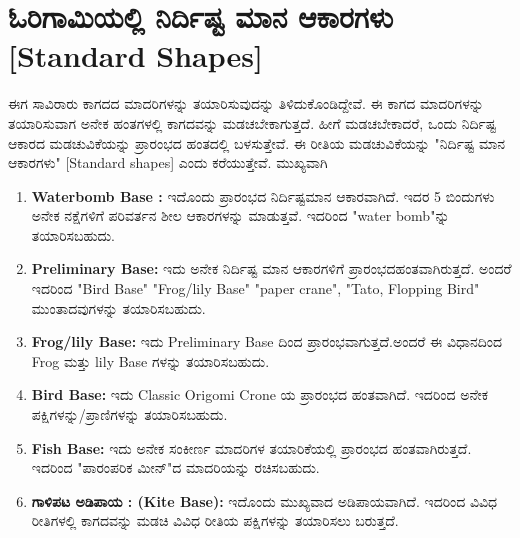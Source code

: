 \bigskip

 
 \section{ಓರಿಗಾಮಿಯಲ್ಲಿ ನಿರ್ದಿಷ್ಟ ಮಾನ ಆಕಾರಗಳು [Standard Shapes]}\label{sec2.1}%
 
 ಈಗ ಸಾವಿರಾರು ಕಾಗದದ ಮಾದರಿಗಳನ್ನು ತಯಾರಿಸುವುದನ್ನು ತಿಳಿದುಕೊಂಡಿದ್ದೇವೆ. ಈ ಕಾಗದ ಮಾದರಿಗಳನ್ನು ತಯಾರಿಸುವಾಗ ಅನೇಕ ಹಂತಗಳಲ್ಲಿ ಕಾಗದವನ್ನು ಮಡಚಬೇಕಾಗುತ್ತದೆ. ಹೀಗೆ ಮಡಚಬೇಕಾದರೆ, ಒಂದು ನಿರ್ದಿಷ್ಟ ಆಕಾರದ ಮಡಚುವಿಕೆಯನ್ನು ಪ್ರಾರಂಭದ ಹಂತದಲ್ಲಿ ಬಳಸುತ್ತೇವೆ. ಈ ರೀತಿಯ ಮಡಚುವಿಕೆಯನ್ನು "ನಿರ್ದಿಷ್ಟ ಮಾನ ಆಕಾರಗಳು" [Standard shapes] ಎಂದು ಕರೆಯುತ್ತೇವೆ. ಮುಖ್ಯವಾಗಿ 
 \begin{enumerate}
  \item[{\bf [a]}] \textbf{Waterbomb Base :} ಇದೊಂದು ಪ್ರಾರಂಭದ ನಿರ್ದಿಷ್ಟಮಾನ ಆಕಾರ\-ವಾಗಿದೆ. ಇದರ 5 ಬಿಂದುಗಳು ಅನೇಕ ನಕ್ಷೆಗಳಿಗೆ ಪರಿವರ್ತನ ಶೀಲ ಆಕಾರಗಳನ್ನು ಮಾಡುತ್ತವೆ. ಇದರಿಂದ "water bomb"ನ್ನು ತಯಾರಿಸಬಹುದು.

\medskip
  
  \item[{\bf [b]}] \textbf{Preliminary Base:} ಇದು ಅನೇಕ ನಿರ್ದಿಷ್ಟ ಮಾನ ಆಕಾರಗಳಿಗೆ ಪ್ರಾರಂಭದ\break ಹಂತವಾಗಿರುತ್ತದೆ. ಅಂದರೆ ಇದರಿಂದ "Bird Base" "Frog/lily Base" "paper crane", "Tato, Flopping Bird"  ಮುಂತಾದವುಗಳನ್ನು ತಯಾರಿಸಬಹುದು.  

\medskip
  
  \item[{\bf [c]}] \textbf{Frog/lily Base:} ಇದು Preliminary Base ದಿಂದ ಪ್ರಾರಂಭವಾಗುತ್ತದೆ.\break ಅಂದರೆ ಈ ವಿಧಾನದಿಂದ Frog ಮತ್ತು lily Base ಗಳನ್ನು ತಯಾರಿಸಬಹುದು.

\medskip
   
  \item[{\bf [d]}] \textbf{Bird  Base:} ಇದು Classic Origomi Crone ಯ ಪ್ರಾರಂಭದ ಹಂತವಾಗಿದೆ. ಇದರಿಂದ ಅನೇಕ ಪಕ್ಷಿಗಳನ್ನು/ಪ್ರಾಣಿಗಳನ್ನು ತಯಾರಿಸಬಹುದು. 


  \medskip
  
  \item[{\bf [e]}] \textbf{Fish Base:}  ಇದು ಅನೇಕ ಸಂಕೀರ್ಣ ಮಾದರಿಗಳ ತಯಾರಿಕೆಯಲ್ಲಿ ಪ್ರಾರಂಭದ ಹಂತವಾಗಿರುತ್ತದೆ. ಇದರಿಂದ "ಪಾರಂಪರಿಕ ಮೀನ್"ದ ಮಾದರಿಯನ್ನು ರಚಿಸಬಹುದು.
  
  \medskip
  
  \item[{\bf [f]}] \textbf{ಗಾಳಿಪಟ ಅಡಿಪಾಯ : (Kite Base):} ಇದೊಂದು ಮುಖ್ಯವಾದ ಅಡಿಪಾಯವಾಗಿದೆ. ಇದರಿಂದ ವಿವಿಧ ರೀತಿಗಳಲ್ಲಿ ಕಾಗದವನ್ನು ಮಡಚಿ ವಿವಿಧ ರೀತಿಯ ಪಕ್ಷಿಗ\-ಳನ್ನು ತಯಾರಿಸಲು ಬರುತ್ತದೆ. 
\end{enumerate}

